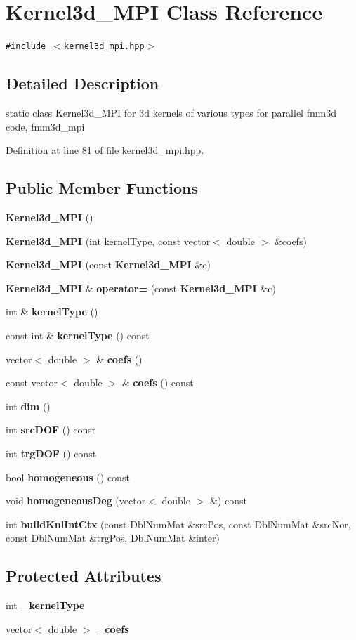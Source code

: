 \section{Kernel3d\_\-MPI Class Reference}
\label{classKernel3d__MPI}
{\tt \#include $<$kernel3d\_\-mpi.hpp$>$}



\subsection{Detailed Description}
static class Kernel3d\_\-MPI for 3d kernels of various types for parallel fmm3d code, fmm3d\_\-mpi 



Definition at line 81 of file kernel3d\_\-mpi.hpp.\subsection*{Public Member Functions}
\begin{CompactItemize}
\item 
{\bf Kernel3d\_\-MPI} ()
\item 
{\bf Kernel3d\_\-MPI} (int kernel\-Type, const vector$<$ double $>$ \&coefs)
\item 
{\bf Kernel3d\_\-MPI} (const {\bf Kernel3d\_\-MPI} \&c)
\item 
{\bf Kernel3d\_\-MPI} \& {\bf operator=} (const {\bf Kernel3d\_\-MPI} \&c)
\item 
int \& {\bf kernel\-Type} ()
\item 
const int \& {\bf kernel\-Type} () const 
\item 
vector$<$ double $>$ \& {\bf coefs} ()
\item 
const vector$<$ double $>$ \& {\bf coefs} () const 
\item 
int {\bf dim} ()
\item 
int {\bf src\-DOF} () const 
\item 
int {\bf trg\-DOF} () const 
\item 
bool {\bf homogeneous} () const 
\item 
void {\bf homogeneous\-Deg} (vector$<$ double $>$ \&) const 
\item 
int {\bf build\-Knl\-Int\-Ctx} (const Dbl\-Num\-Mat \&src\-Pos, const Dbl\-Num\-Mat \&src\-Nor, const Dbl\-Num\-Mat \&trg\-Pos, Dbl\-Num\-Mat \&inter)
\end{CompactItemize}
\subsection*{Protected Attributes}
\begin{CompactItemize}
\item 
int {\bf \_\-kernel\-Type}
\item 
vector$<$ double $>$ {\bf \_\-coefs}
\end{CompactItemize}
